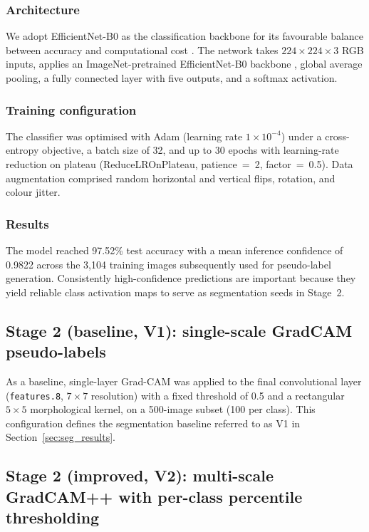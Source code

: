\documentclass[final,5p,times,twocolumn,authoryear]{elsarticle}
\begin{document}
\subsubsection{Architecture}

We adopt EfficientNet-B0 as the classification backbone for its favourable balance between accuracy and computational cost \citep{tan2019efficientnet}. The network takes $224\times224\times3$ RGB inputs, applies an ImageNet-pretrained EfficientNet-B0 backbone \citep{deng2009imagenet}, global average pooling, a fully connected layer with five outputs, and a softmax activation.

\subsubsection{Training configuration}

The classifier was optimised with Adam (learning rate $1\times10^{-4}$) under a cross-entropy objective, a batch size of 32, and up to 30 epochs with learning-rate reduction on plateau (ReduceLROnPlateau, patience~=~2, factor~=~0.5). Data augmentation comprised random horizontal and vertical flips, rotation, and colour jitter.

\subsubsection{Results}

The model reached 97.52\% test accuracy with a mean inference confidence of 0.9822 across the 3{,}104 training images subsequently used for pseudo-label generation. Consistently high-confidence predictions are important because they yield reliable class activation maps to serve as segmentation seeds in Stage~2.

\subsection{Stage 2 (baseline, V1): single-scale GradCAM pseudo-labels}

As a baseline, single-layer Grad-CAM was applied to the final convolutional layer (\texttt{features.8}, $7\times7$ resolution) with a fixed threshold of 0.5 and a rectangular $5\times5$ morphological kernel, on a 500-image subset (100 per class). This configuration defines the segmentation baseline referred to as V1 in Section~\ref{sec:seg_results}.

\subsection{Stage 2 (improved, V2): multi-scale GradCAM++ with per-class percentile thresholding}
\label{sec:stage2v2}
\end{document}
